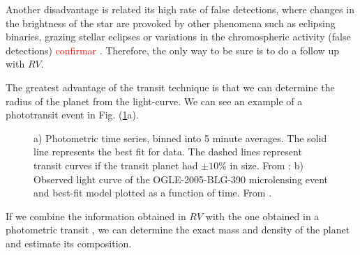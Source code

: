 \documentclass[dvips,12pt,a4paper]{report}
\begin{document}
Another disadvantage is related its high rate of false detections, where changes in the brightness of the star are provoked by other phenomena such as eclipsing binaries, grazing stellar eclipses or variations in the chromospheric activity (false detections) \textcolor{red}{confirmar} . Therefore, the only way to be sure is to do a follow up with $RV$. 

The greatest advantage of the transit technique is that we can determine the radius of the planet from the light-curve. We can see an example of a phototransit event in Fig. (\ref{photot}a). 

\begin{figure}[h]
\centering
{}
\caption[Example of a phototransit and microlensing event]{a) Photometric time series, binned into 5 minute averages. The solid line represents the best fit for data. The dashed lines represent transit curves if the transit planet had $\pm10\%$ in size. From \citet{Charbonneau-2000}; b) Observed light curve of the OGLE-2005-BLG-390 microlensing event and best-fit model plotted as a function of time. From \citet{Beaulieu-2006}.}
\label{photot}
\end{figure}

If we combine the information obtained in $RV$ with the one obtained in a photometric transit \citep{Charbonneau-2000}, we can determine the exact mass and density of the planet and estimate its composition.
\end{document}
